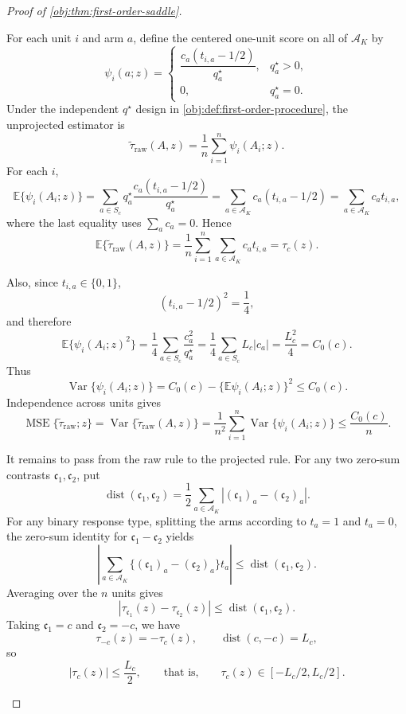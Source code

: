\documentclass[11pt]{article}
\begin{document}
\begin{proof}[Proof of \cref{obj:thm:first-order-saddle}]
\begin{enumerate}
For each unit \(i\) and arm \(a\), define the centered one-unit score on all of \(\mathcal A_K\) by
\[
\psi_i(a;z)=
\begin{cases}
\dfrac{c_a(t_{i,a}-1/2)}{q_a^\star}, & q_a^\star>0,\\[1.2ex]
0, & q_a^\star=0.
\end{cases}
\]
Under the independent \(q^\star\) design in \cref{obj:def:first-order-procedure}, the unprojected estimator is
\[
\widetilde\tau_{\mathrm{raw}}(A,z)
=
\frac1n\sum_{i=1}^n \psi_i(A_i;z).
\]
For each \(i\),
\[
\mathbb E\{\psi_i(A_i;z)\}
=
\sum_{a\in S_c} q_a^\star
\frac{c_a(t_{i,a}-1/2)}{q_a^\star}
=
\sum_{a\in\mathcal A_K} c_a(t_{i,a}-1/2)
=
\sum_{a\in\mathcal A_K} c_a t_{i,a},
\]
where the last equality uses \(\sum_a c_a=0\). Hence
\[
\mathbb E\{\widetilde\tau_{\mathrm{raw}}(A,z)\}
=
\frac1n\sum_{i=1}^n\sum_{a\in\mathcal A_K}c_at_{i,a}
=
\tau_c(z).
\]

Also, since \(t_{i,a}\in\{0,1\}\),
\[
(t_{i,a}-1/2)^2=\frac14,
\]
and therefore
\[
\mathbb E\{\psi_i(A_i;z)^2\}
=
\frac14\sum_{a\in S_c}\frac{c_a^2}{q_a^\star}
=
\frac14\sum_{a\in S_c}L_c|c_a|
=
\frac{L_c^2}{4}
=
C_0(c).
\]
Thus
\[
\operatorname{Var}\{\psi_i(A_i;z)\}
=
C_0(c)-\{\mathbb E\psi_i(A_i;z)\}^2
\le C_0(c).
\]
Independence across units gives
\[
\operatorname{MSE}\{\widetilde\tau_{\mathrm{raw}};z\}
=
\operatorname{Var}\{\widetilde\tau_{\mathrm{raw}}(A,z)\}
=
\frac1{n^2}\sum_{i=1}^n
\operatorname{Var}\{\psi_i(A_i;z)\}
\le
\frac{C_0(c)}{n}.
\]

It remains to pass from the raw rule to the projected rule. For any two zero-sum contrasts \(\mathfrak c_1,\mathfrak c_2\), put
\[
\operatorname{dist}(\mathfrak c_1,\mathfrak c_2)
=
\frac12\sum_{a\in\mathcal A_K}
|(\mathfrak c_1)_a-(\mathfrak c_2)_a|.
\]
For any binary response type, splitting the arms according to \(t_a=1\) and \(t_a=0\), the zero-sum identity for \(\mathfrak c_1-\mathfrak c_2\) yields
\[
\left|
\sum_{a\in\mathcal A_K}
\{(\mathfrak c_1)_a-(\mathfrak c_2)_a\}t_a
\right|
\le
\operatorname{dist}(\mathfrak c_1,\mathfrak c_2).
\]
Averaging over the \(n\) units gives
\[
|\tau_{\mathfrak c_1}(z)-\tau_{\mathfrak c_2}(z)|
\le
\operatorname{dist}(\mathfrak c_1,\mathfrak c_2).
\]
Taking \(\mathfrak c_1=c\) and \(\mathfrak c_2=-c\), we have
\[
\tau_{-c}(z)=-\tau_c(z),
\qquad
\operatorname{dist}(c,-c)=L_c,
\]
so
\[
|\tau_c(z)|\le \frac{L_c}{2},
\qquad\text{that is,}\qquad
\tau_c(z)\in[-L_c/2,L_c/2].
\]


\end{enumerate}
\end{proof}
\end{document}
